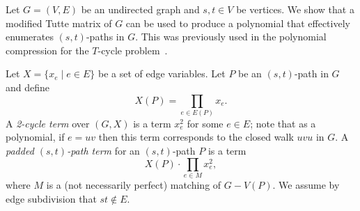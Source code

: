 \documentclass[10pt,a4paper]{article}
\begin{document}
Let $G=(V,E)$ be an undirected graph and $s, t \in V$ be vertices. We
show that a modified Tutte matrix of $G$ can be used to produce a
polynomial that effectively enumerates $(s,t)$-paths in $G$. This was
previously used in the polynomial compression for the $T$-cycle
problem~\cite{Wahlstrom13STACS}. 

Let $X=\{x_e \mid e \in E\}$ be a set of edge variables. 
Let $P$ be an $(s,t)$-path in $G$ and define
\[
  X(P) = \prod_{e \in E(P)} x_e.
\]
A \emph{2-cycle term} over $(G,X)$ is a term $x_e^2$ for some $e \in E$;
note that as a polynomial, if $e=uv$ then this term corresponds to the
closed walk $uvu$ in $G$. A \emph{padded $(s,t)$-path term} for an
$(s,t)$-path $P$ is a term
\[
  X(P) \cdot \prod_{e \in M} x_e^2,
\]
where $M$ is a (not necessarily perfect) matching of $G-V(P)$.
We assume by edge subdivision that $st \notin E$.
\end{document}

